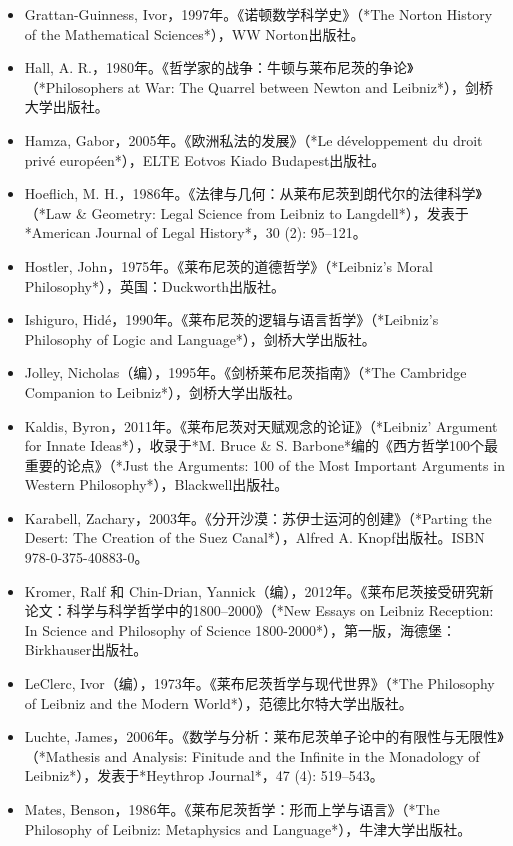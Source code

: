 \begin{itemize}
\item Grattan-Guinness, Ivor，1997年。《诺顿数学科学史》（*The Norton History of the Mathematical Sciences*），WW Norton出版社。  
\item Hall, A. R.，1980年。《哲学家的战争：牛顿与莱布尼茨的争论》（*Philosophers at War: The Quarrel between Newton and Leibniz*），剑桥大学出版社。  
\item Hamza, Gabor，2005年。《欧洲私法的发展》（*Le développement du droit privé européen*），ELTE Eotvos Kiado Budapest出版社。  
\item Hoeflich, M. H.，1986年。《法律与几何：从莱布尼茨到朗代尔的法律科学》（*Law & Geometry: Legal Science from Leibniz to Langdell*），发表于*American Journal of Legal History*，30 (2): 95–121。  
\item Hostler, John，1975年。《莱布尼茨的道德哲学》（*Leibniz's Moral Philosophy*），英国：Duckworth出版社。  
\item Ishiguro, Hidé，1990年。《莱布尼茨的逻辑与语言哲学》（*Leibniz's Philosophy of Logic and Language*），剑桥大学出版社。  
\item Jolley, Nicholas（编），1995年。《剑桥莱布尼茨指南》（*The Cambridge Companion to Leibniz*），剑桥大学出版社。  
\item Kaldis, Byron，2011年。《莱布尼茨对天赋观念的论证》（*Leibniz' Argument for Innate Ideas*），收录于*M. Bruce & S. Barbone*编的《西方哲学100个最重要的论点》（*Just the Arguments: 100 of the Most Important Arguments in Western Philosophy*），Blackwell出版社。  
\item Karabell, Zachary，2003年。《分开沙漠：苏伊士运河的创建》（*Parting the Desert: The Creation of the Suez Canal*），Alfred A. Knopf出版社。ISBN 978-0-375-40883-0。  
\item Kromer, Ralf 和 Chin-Drian, Yannick（编），2012年。《莱布尼茨接受研究新论文：科学与科学哲学中的1800–2000》（*New Essays on Leibniz Reception: In Science and Philosophy of Science 1800-2000*），第一版，海德堡：Birkhauser出版社。  
\item LeClerc, Ivor（编），1973年。《莱布尼茨哲学与现代世界》（*The Philosophy of Leibniz and the Modern World*），范德比尔特大学出版社。  
\item Luchte, James，2006年。《数学与分析：莱布尼茨单子论中的有限性与无限性》（*Mathesis and Analysis: Finitude and the Infinite in the Monadology of Leibniz*），发表于*Heythrop Journal*，47 (4): 519–543。  
\item Mates, Benson，1986年。《莱布尼茨哲学：形而上学与语言》（*The Philosophy of Leibniz: Metaphysics and Language*），牛津大学出版社。  

\end{itemize}
